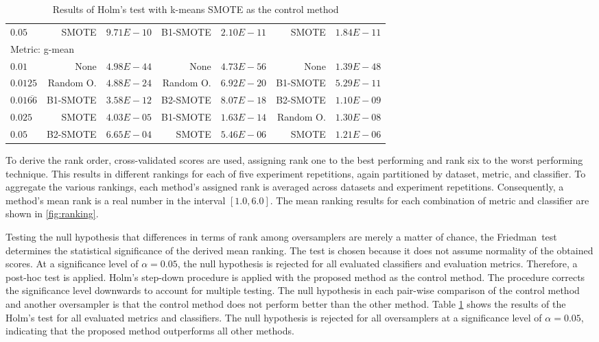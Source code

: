 \documentclass[sort&compress]{elsarticle}
\begin{document}
\begin{table}[!htb]
\begin{tabular}{lrrrrrr}
	$0.05$        		& SMOTE             & $9.71E-10$ & B1-SMOTE          & $2.10E-11$ & SMOTE             & $1.84E-11$ \\
	\multicolumn{2}{l}{Metric: g-mean} & & & & & \\
	$0.01$        		& None              & $4.98E-44$    & None              & $4.73E-56$ & None              & $1.39E-48$ \\
	$0.0125$      		& Random O. & $4.88E-24$    & Random O. & $6.92E-20$ & B1-SMOTE          & $5.29E-11$ \\
	$0.01\overline{66}$ 	& B1-SMOTE          & $3.58E-12$    & B2-SMOTE          & $8.07E-18$ & B2-SMOTE          & $1.10E-09$ \\
	$0.025$       		& SMOTE             & $4.03E-05$    & B1-SMOTE          & $1.63E-14$ & Random O. & $1.30E-08$ \\
	$0.05$        		& B2-SMOTE          & $6.65E-04$ & SMOTE             & $5.46E-06$ & SMOTE             & $1.21E-06$ \\
	\bottomrule
	\end{tabular}
	\caption{Results of Holm's test with k-means \ac{SMOTE} as the control method}
	\label{tab:holm}
\end{table}

To derive the rank order, cross-validated scores are used, assigning rank one to
the best performing and rank six to the worst performing technique. This results
in different rankings for each of five experiment repetitions, again partitioned
by dataset, metric, and classifier. To aggregate the various rankings, each
method's assigned rank is averaged across datasets and experiment repetitions.
Consequently, a method's mean rank is a real number in the interval $[1.0,6.0]$.
The mean ranking results for each combination of metric and classifier are shown
in \cref{fig:ranking}.

Testing the null hypothesis that differences in terms of rank among oversamplers
are merely a matter of chance, the Friedman~test determines the statistical
significance of the derived mean ranking. The test is chosen because it does not
assume normality of the obtained scores. At a significance level of $\alpha =
0.05$, the null hypothesis is rejected for all evaluated classifiers and
evaluation metrics. Therefore, a post-hoc test is applied. Holm's step-down
procedure is applied with the proposed method as the control method. The
procedure corrects the significance level downwards to account for multiple
testing. The null hypothesis in each pair-wise comparison of the control method
and another oversampler is that the control method does not perform better than
the other method. Table \ref{tab:holm} shows the results of the Holm's test for
all evaluated metrics and classifiers. The null hypothesis is rejected for all
oversamplers at a significance level of $\alpha = 0.05$, indicating that the
proposed method outperforms all other methods.
\end{document}
